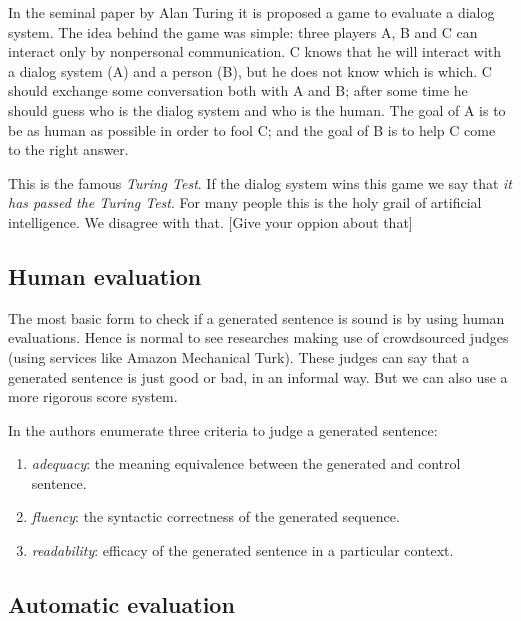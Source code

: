 \label{ch:03-eval}

In the seminal paper by Alan Turing \cite{Turing} it is proposed a game to evaluate a dialog system. The idea behind the game was simple: three players A, B and C can interact only by nonpersonal communication. C knows that he will interact with a dialog system (A) and a person (B), but he does not know which is which. C should exchange some conversation both with A and B; after some time he should guess who is the dialog system and who is the human. The goal of A is to be as human as possible in order to fool C; and the goal of B is to help C come to the right answer.

\par This is the famous \textit{Turing Test}. If the dialog system wins this game we say that \textit{it has passed the Turing Test}. For many people this is the holy grail of artificial intelligence. We disagree with that. [Give your oppion about that]


\subsection{Human evaluation}

The most basic form to check if a generated sentence is sound is by using human evaluations. Hence is normal to see researches making use of crowdsourced judges (using services like Amazon Mechanical Turk). These judges can say that a generated sentence is just good or bad, in an informal way. But we can also use a more rigorous score system. 



In \cite{Stent} the authors enumerate three criteria to judge a generated sentence:

\begin{enumerate}
\item \textit{adequacy}: the meaning equivalence between the generated and control sentence. 
\item \textit{fluency}: the syntactic correctness of the generated sequence.
\item \textit{readability}: efficacy of the generated sentence in a particular context.
\end{enumerate}



\subsection{Automatic evaluation}


